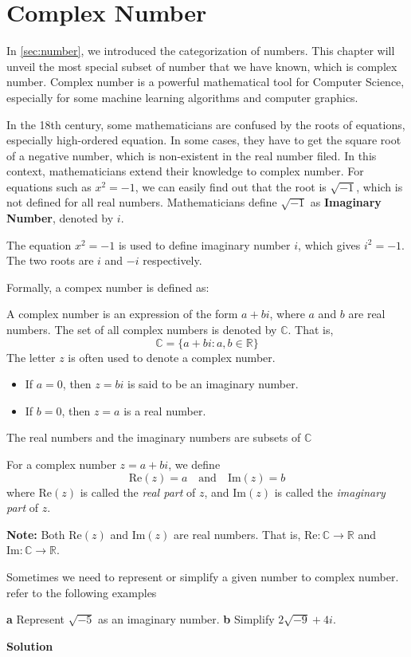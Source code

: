 \documentclass[
	12pt, %
	fleqn, %
	a4paper, %
]{LegrandOrangeBook}
\begin{document}
\chapter{Complex Number}
In \autoref{sec:number}, we introduced the categorization of numbers. This chapter will unveil the
most special subset of number that we have known, which is complex number. Complex number is a powerful
mathematical tool for Computer Science, especially for some machine learning algorithms and computer graphics.

In the 18th century, some mathematicians are confused by the roots of equations, especially  high-ordered equation.
In some cases, they have to get the square root of a negative number, which is non-existent in the real number filed.
In this context, mathematicians extend their knowledge to complex number. For equations such as $x^2 = -1$,
we can easily find out that the root is $\sqrt{-1}$, which is not defined for all real numbers. Mathematicians
define $\sqrt{-1}$ as \textbf{Imaginary Number}, denoted by $i$.
\begin{definition}
    The equation $x^2 = -1$ is used to define imaginary number $i$, which gives $i^2 = -1$. The two roots are $i$
    and $-i$ respectively.
\end{definition}

Formally, a compex number is defined as:
\begin{definition}
    A complex number is an expression of the form \(a + bi\), where \(a\) and \(b\) are real numbers.
The set of all complex numbers is denoted by \(\mathbb{C}\). That is,
\[
\mathbb{C} = \{ a + bi : a, b \in \mathbb{R} \}
\]
The letter \(z\) is often used to denote a complex number.
\begin{itemize}
    \item If \( a = 0 \), then \( z = bi \) is said to be an imaginary number.
    \item If \( b = 0 \), then \( z = a \) is a real number.
\end{itemize}
The real numbers and the imaginary numbers are subsets of \( \mathbb{C} \)
\end{definition}

\begin{definition} 
    For a complex number \( z = a + bi \), we define
\[
\text{Re}(z) = a \quad \text{and} \quad \text{Im}(z) = b
\]
where \(\text{Re}(z)\) is called the \textit{real part} of \(z\), and \(\text{Im}(z)\) is called the \textit{imaginary part} of \(z\).

\textbf{Note:} Both \(\text{Re}(z)\) and \(\text{Im}(z)\) are real numbers. That is, \(\text{Re}: \mathbb{C} \rightarrow \mathbb{R}\) and \(\text{Im}: \mathbb{C} \rightarrow \mathbb{R}\).
\end{definition}    
Sometimes we need to represent or simplify a given number to complex number. refer to the following examples
\begin{example}
    \textbf{a} Represent \(\sqrt{-5}\) as an imaginary number. \quad
    \textbf{b} Simplify \(2\sqrt{-9} + 4i\).
\end{example}
\textbf{Solution}
\end{document}
